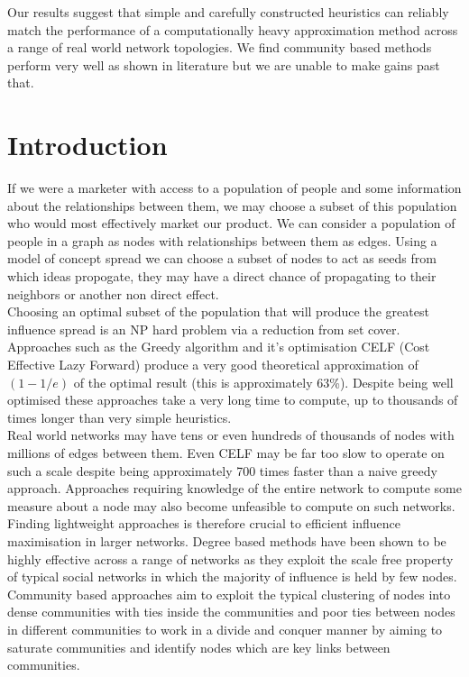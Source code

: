 \documentclass{article}
\begin{document}
Our results suggest that simple and carefully constructed heuristics can reliably match the performance of a computationally heavy approximation method across a range of real world network topologies.
We find community based methods perform very well as shown in literature but we are unable to make gains past that.

\newpage
\section{Introduction}
If we were a marketer with access to a population of people and some information about the relationships between them, we may choose a subset of this population who would most effectively market our product.
We can consider a population of people in a graph as nodes with relationships between them as edges.
Using a model of concept spread we can choose a subset of nodes to act as seeds from which ideas propogate, they may have a direct chance of propagating to their neighbors or another non direct effect.
\\

Choosing an optimal subset of the population that will produce the greatest influence spread is an NP hard problem via a reduction from set cover.
Approaches such as the Greedy algorithm and it's optimisation CELF (Cost Effective Lazy Forward) produce a very good theoretical approximation of $(1-1/e)$ of the optimal result (this is approximately 63\%).
Despite being well optimised these approaches take a very long time to compute, up to thousands of times longer than very simple heuristics.
\\

Real world networks may have tens or even hundreds of thousands of nodes with millions of edges between them.
Even CELF may be far too slow to operate on such a scale despite being approximately 700 times faster than a naive greedy approach.
Approaches requiring knowledge of the entire network to compute some measure about a node may also become unfeasible to compute on such networks.
Finding lightweight approaches is therefore crucial to efficient influence maximisation in larger networks.
Degree based methods have been shown to be highly effective across a range of networks as they exploit the scale free property of typical social networks in which the majority of influence is held by few nodes.
Community based approaches aim to exploit the typical clustering of nodes into dense communities with ties inside the communities and poor ties between nodes in different communities to work in a divide and conquer manner by aiming to saturate communities and identify nodes which are key links between communities.
\\
\end{document}
